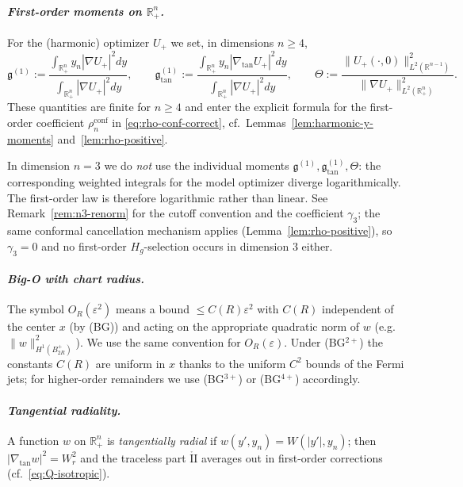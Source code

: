 \documentclass[11pt,reqno,a4paper]{amsart}
\newcommand{\R}{\mathbb{R}}
\numberwithin{equation}{section}
\theoremstyle{plain}
\theoremstyle{remark}
\theoremstyle{plain}
\begin{document}
\paragraph{\emph{First-order moments on $\R^n_+$.}}\label{par:moments-first}
For the (harmonic) optimizer $U_+$ we set, in dimensions $n\ge4$,
\[
\mathfrak g^{(1)}:=\frac{\int_{\R^n_+} y_n|\nabla U_+|^2dy}{\int_{\R^n_+}|\nabla U_+|^2dy},
\qquad
\mathfrak g^{(1)}_{\tan}:=\frac{\int_{\R^n_+} y_n|\nabla_{\tan}U_+|^2dy}{\int_{\R^n_+}|\nabla U_+|^2dy},
\qquad
\Theta:=\frac{\|U_+(\cdot,0)\|_{L^2(\R^{n-1})}^2}{\|\nabla U_+\|_{L^2(\R^n_+)}^2}.
\]
These quantities are finite for $n\ge4$ and enter the explicit formula for the first-order
coefficient $\rho_n^{\mathrm{conf}}$ in \eqref{eq:rho-conf-correct}, cf.\
Lemmas~\ref{lem:harmonic-y-moments} and~\ref{lem:rho-positive}.

In dimension $n=3$ we do \emph{not} use the individual moments
$\mathfrak g^{(1)},\mathfrak g^{(1)}_{\tan},\Theta$: the corresponding weighted
integrals for the model optimizer diverge logarithmically.  The first-order law is
therefore logarithmic rather than linear.  See Remark~\ref{rem:n3-renorm} for the
cutoff convention and the coefficient $\gamma_3$; the same conformal cancellation mechanism applies
(Lemma~\ref{lem:rho-positive}), so $\gamma_3=0$ and no first-order $H_g$-selection
occurs in dimension $3$ either.

\medskip
\paragraph{\emph{Big-O with chart radius.}}
The symbol $O_R(\varepsilon^2)$ means a bound $\le C(R)\varepsilon^2$ with $C(R)$ independent of the center $x$ (by (BG)) and acting on the appropriate quadratic norm of $w$ (e.g.\ $\|w\|_{H^1(B_{2R}^+)}^2$). We use the same convention for $O_R(\varepsilon)$. Under \textup{(BG$^{2+}$)} the constants $C(R)$ are uniform in $x$ thanks to the uniform $C^2$ bounds of the Fermi jets; for higher-order remainders we use \textup{(BG$^{3+}$)} or \textup{(BG$^{4+}$)} accordingly.
\medskip
\paragraph{\emph{Tangential radiality.}}
A function $w$ on $\R^n_+$ is \emph{tangentially radial} if $w(y',y_n)=W(|y'|,y_n)$; then $|\nabla_{\tan}w|^2=W_r^2$ and the traceless part $\mathring{\mathrm{II}}$ averages out in first-order corrections (cf.\ \eqref{eq:Q-isotropic}).
\end{document}
